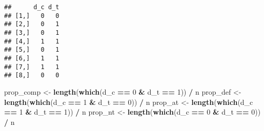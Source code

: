 \documentclass[12pt,leqno]{article}
\newenvironment{Shaded}{\begin{snugshade}}{\end{snugshade}}
\newcommand{\DecValTok}[1]{\textcolor[rgb]{0.00,0.00,0.81}{#1}}
\newcommand{\KeywordTok}[1]{\textcolor[rgb]{0.13,0.29,0.53}{\textbf{#1}}}
\newcommand{\NormalTok}[1]{#1}
\newcommand{\OperatorTok}[1]{\textcolor[rgb]{0.81,0.36,0.00}{\textbf{#1}}}
\newcommand{\StringTok}[1]{\textcolor[rgb]{0.31,0.60,0.02}{#1}}
\theoremstyle{newstyle}
\begin{document}
\begin{verbatim}
##      d_c d_t
## [1,]   0   0
## [2,]   0   1
## [3,]   0   1
## [4,]   1   1
## [5,]   0   1
## [6,]   1   1
## [7,]   1   1
## [8,]   0   0
\end{verbatim}

\begin{Shaded}
\begin{Highlighting}[]
\NormalTok{prop_comp <-}\StringTok{ }\KeywordTok{length}\NormalTok{(}\KeywordTok{which}\NormalTok{(d_c }\OperatorTok{==}\StringTok{ }\DecValTok{0} \OperatorTok{&}\StringTok{ }\NormalTok{d_t }\OperatorTok{==}\StringTok{ }\DecValTok{1}\NormalTok{)) }\OperatorTok{/}\StringTok{ }\NormalTok{n}
\NormalTok{prop_def <-}\StringTok{ }\KeywordTok{length}\NormalTok{(}\KeywordTok{which}\NormalTok{(d_c }\OperatorTok{==}\StringTok{ }\DecValTok{1} \OperatorTok{&}\StringTok{ }\NormalTok{d_t }\OperatorTok{==}\StringTok{ }\DecValTok{0}\NormalTok{)) }\OperatorTok{/}\StringTok{ }\NormalTok{n}
\NormalTok{prop_at <-}\StringTok{ }\KeywordTok{length}\NormalTok{(}\KeywordTok{which}\NormalTok{(d_c }\OperatorTok{==}\StringTok{ }\DecValTok{1} \OperatorTok{&}\StringTok{ }\NormalTok{d_t }\OperatorTok{==}\StringTok{ }\DecValTok{1}\NormalTok{)) }\OperatorTok{/}\StringTok{ }\NormalTok{n}
\NormalTok{prop_nt <-}\StringTok{ }\KeywordTok{length}\NormalTok{(}\KeywordTok{which}\NormalTok{(d_c }\OperatorTok{==}\StringTok{ }\DecValTok{0} \OperatorTok{&}\StringTok{ }\NormalTok{d_t }\OperatorTok{==}\StringTok{ }\DecValTok{0}\NormalTok{)) }\OperatorTok{/}\StringTok{ }\NormalTok{n}


\end{Highlighting}
\end{Shaded}
\end{document}
